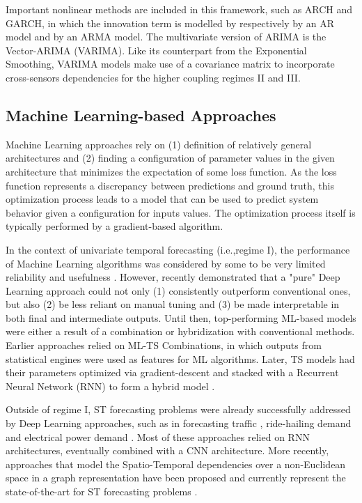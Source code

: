 Important nonlinear methods are included in this framework, such as ARCH and GARCH, in which the innovation term is modelled by respectively by an AR model and by an ARMA model.
The multivariate version of ARIMA is the Vector-ARIMA (VARIMA).
Like its counterpart from the Exponential Smoothing, VARIMA models make use of a covariance matrix to incorporate cross-sensors dependencies for the higher coupling regimes II and III.

\subsection{Machine Learning-based Approaches}
Machine Learning approaches rely on (1) definition of relatively general architectures and (2) finding a configuration of parameter values in the given architecture that minimizes the expectation of some loss function.
As the loss function represents a discrepancy between predictions and ground truth, this optimization process leads to a model that can be used to predict system behavior given a configuration for inputs values.
The optimization process itself is typically performed by a gradient-based algorithm. \cite{goodfellow2016deep}

In the context of univariate temporal forecasting (i.e.,regime I), the performance of Machine Learning algorithms was considered by some to be very limited reliability and usefulness \cite{makridakis2000m3}.
However, \cite{bengio2019nbeats} recently demonstrated that a "pure" Deep Learning approach could not only (1) consistently outperform conventional ones, but also (2) be less reliant on manual tuning and (3) be made interpretable in both final and intermediate outputs.
Until then, top-performing ML-based models were either a result of a combination or hybridization with conventional methods.
Earlier approaches relied on ML-TS Combinations, in which outputs from statistical engines were used as features for ML algorithms.
Later, TS models had their parameters optimized via gradient-descent and stacked with a Recurrent Neural Network (RNN) to form a hybrid model \cite{smyl2020esrnn}.

Outside of regime I, ST forecasting problems were already successfully addressed by Deep Learning approaches, such as in forecasting traffic \cite{liu2017dcrnn}, ride-hailing demand \cite{li2019stgcn} and electrical power demand \cite{toubeau2018blstm}.
Most of these approaches relied on RNN architectures, eventually combined with a CNN architecture.
More recently, approaches that model the Spatio-Temporal dependencies over a non-Euclidean space in a graph representation have been proposed and currently represent the state-of-the-art for ST forecasting problems \cite{zhang2019graphwavenet}.

